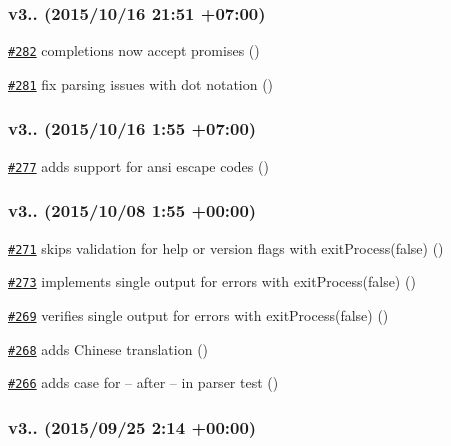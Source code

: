 \subsubsection*{v3.. (2015/10/16 21\+:51 +07\+:00)}


\begin{DoxyItemize}
\item \href{https://github.com/bcoe/yargs/pull/282}{\tt \#282} completions now accept promises ()
\item \href{https://github.com/bcoe/yargs/pull/281}{\tt \#281} fix parsing issues with dot notation ()
\end{DoxyItemize}

\subsubsection*{v3.. (2015/10/16 1\+:55 +07\+:00)}


\begin{DoxyItemize}
\item \href{https://github.com/bcoe/yargs/pull/277}{\tt \#277} adds support for ansi escape codes ()
\end{DoxyItemize}

\subsubsection*{v3.. (2015/10/08 1\+:55 +00\+:00)}


\begin{DoxyItemize}
\item \href{https://github.com/bcoe/yargs/pull/273}{\tt \#271} skips validation for help or version flags with exit\+Process(false) ()
\item \href{https://github.com/bcoe/yargs/pull/273}{\tt \#273} implements single output for errors with exit\+Process(false) ()
\item \href{https://github.com/bcoe/yargs/pull/269}{\tt \#269} verifies single output for errors with exit\+Process(false) ()
\item \href{https://github.com/bcoe/yargs/pull/268}{\tt \#268} adds Chinese translation ()
\item \href{https://github.com/bcoe/yargs/pull/266}{\tt \#266} adds case for -- after -- in parser test ()
\end{DoxyItemize}

\subsubsection*{v3.. (2015/09/25 2\+:14 +00\+:00)}


